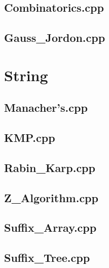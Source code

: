 \subsection{Combinatorics.cpp}

\subsection{Gauss\_Jordon.cpp}

\section{String}
\subsection{Manacher's.cpp}

\subsection{KMP.cpp}

\subsection{Rabin\_Karp.cpp}

\subsection{Z\_Algorithm.cpp}

\subsection{Suffix\_Array.cpp}

\subsection{Suffix\_Tree.cpp}

